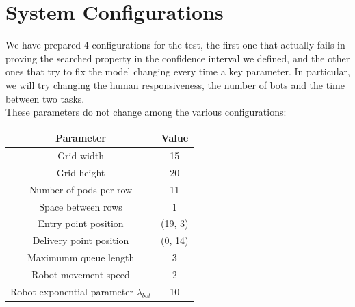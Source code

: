 \documentclass[10pt,a4paper]{article}
\begin{document}
	\section{System Configurations}
		We have prepared 4 configurations for the test, the first one that actually fails in proving the searched property in the confidence interval we defined, and the other ones that try to fix the model changing every time a key parameter. In particular, we will try changing the human responsiveness, the number of bots and the time between two tasks.\\
		These parameters do not change among the various configurations:
		\begin{center}
				\begin{tabular}{ |c|c|}
					\hline
					Parameter & Value \\
					\hline
					\hline
					Grid width & 15\\
					\hline
					Grid height & 20\\
					\hline
					Number of pods per row & 11\\
					\hline
					Space between rows & 1 \\
					\hline
					Entry point position & (19, 3) \\
					\hline
					Delivery point position & (0, 14) \\
					\hline
					Maximumm queue length & 3 \\
					\hline
					Robot movement speed & 2 \\
					\hline
					Robot exponential parameter $\lambda_{bot}$ & 10 \\
					\hline
				\end{tabular}
			\end{center}
\end{document}
